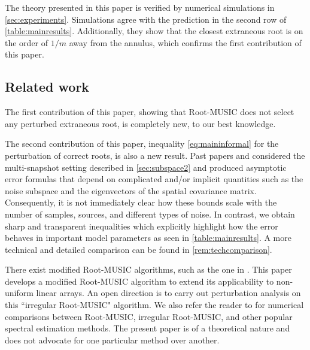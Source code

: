 \documentclass[11pt]{article}
\theoremstyle{definition}
\numberwithin{theorem}{section}
\numberwithin{equation}{section}
\renewcommand{\tilde}{\widetilde}
\numberwithin{equation}{section}
\begin{document}
The theory presented in this paper is verified by numerical simulations in \cref{sec:experiments}. Simulations agree with the prediction in the second row of \cref{table:mainresults}. Additionally, they show that the closest extraneous root is on the order of $1/m$ away from the annulus, which confirms the first contribution of this paper.

\subsection{Related work}

The first contribution of this paper, showing that Root-MUSIC does not select any perturbed extraneous root, is completely new, to our best knowledge. 

The second contribution of this paper, inequality \eqref{eq:maininformal} for the perturbation of correct roots, is also a new result. Past papers  \cite{rao1989performance} and \cite{krim1992operator} considered the multi-snapshot setting described in \cref{sec:subspace2} and produced asymptotic error formulas that depend on complicated and/or implicit quantities such as the noise subspace and the eigenvectors of the spatial covariance matrix. Consequently, it is not immediately clear how these bounds scale with the number of samples, sources, and different types of noise. In contrast, we obtain sharp and transparent inequalities which explicitly highlight how the error behaves in important model parameters as seen in \cref{table:mainresults}. A more technical and detailed comparison can be found in \cref{rem:techcomparison}. 

There exist modified Root-MUSIC algorithms, such as the one in \cite{wagner2021gridless}. This paper develops a modified Root-MUSIC algorithm to extend its applicability to non-uniform linear arrays. An open direction is to carry out perturbation analysis on this ``irregular Root-MUSIC" algorithm. We also refer the reader to \cite{wagner2021gridless} for numerical comparisons between Root-MUSIC, irregular Root-MUSIC, and other popular spectral estimation methods. The present paper is of a theoretical nature and does not advocate for one particular method over another. 

\end{document}
